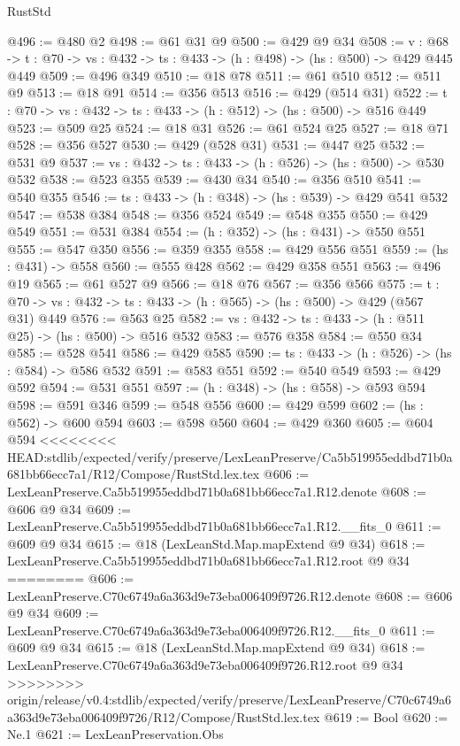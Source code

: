 \begin{lexlean}{RustStd}
\begin{coremodule}
{\begin{coremodule}
@496 := @480 @2
@498 := @61 @31 @9
@500 := @429 @9 @34
@508 := {v : @68} ->
  {t : @70} -> {vs : @432} -> {ts : @433} -> (h : @498) -> (hs : @500) -> @429 @445 @449
@509 := @496 @349
@510 := @18 @78
@511 := @61 @510
@512 := @511 @9
@513 := @18 @91
@514 := @356 @513
@516 := @429 (@514 @31)
@522 := {t : @70} -> {vs : @432} -> {ts : @433} -> (h : @512) -> (hs : @500) -> @516 @449
@523 := @509 @25
@524 := @18 @31
@526 := @61 @524 @25
@527 := @18 @71
@528 := @356 @527
@530 := @429 (@528 @31)
@531 := @447 @25
@532 := @531 @9
@537 := {vs : @432} -> {ts : @433} -> (h : @526) -> (hs : @500) -> @530 @532
@538 := @523 @355
@539 := @430 @34
@540 := @356 @510
@541 := @540 @355
@546 := {ts : @433} -> (h : @348) -> (hs : @539) -> @429 @541 @532
@547 := @538 @384
@548 := @356 @524
@549 := @548 @355
@550 := @429 @549
@551 := @531 @384
@554 := (h : @352) -> (hs : @431) -> @550 @551
@555 := @547 @350
@556 := @359 @355
@558 := @429 @556 @551
@559 := (hs : @431) -> @558
@560 := @555 @428
@562 := @429 @358 @551
@563 := @496 @19
@565 := @61 @527 @9
@566 := @18 @76
@567 := @356 @566
@575 := {t : @70} -> {vs : @432} -> {ts : @433} -> (h : @565) -> (hs : @500) -> @429 (@567 @31) @449
@576 := @563 @25
@582 := {vs : @432} -> {ts : @433} -> (h : @511 @25) -> (hs : @500) -> @516 @532
@583 := @576 @358
@584 := @550 @34
@585 := @528 @541
@586 := @429 @585
@590 := {ts : @433} -> (h : @526) -> (hs : @584) -> @586 @532
@591 := @583 @551
@592 := @540 @549
@593 := @429 @592
@594 := @531 @551
@597 := (h : @348) -> (hs : @558) -> @593 @594
@598 := @591 @346
@599 := @548 @556
@600 := @429 @599
@602 := (hs : @562) -> @600 @594
@603 := @598 @560
@604 := @429 @360
@605 := @604 @594
<<<<<<<< HEAD:stdlib/expected/verify/preserve/LexLeanPreserve/Ca5b519955eddbd71b0a681bb66ecc7a1/R12/Compose/RustStd.lex.tex
@606 := LexLeanPreserve.Ca5b519955eddbd71b0a681bb66ecc7a1.R12.denote
@608 := @606 @9 @34
@609 := LexLeanPreserve.Ca5b519955eddbd71b0a681bb66ecc7a1.R12.__fits_0
@611 := @609 @9 @34
@615 := @18 (LexLeanStd.Map.mapExtend @9 @34)
@618 := LexLeanPreserve.Ca5b519955eddbd71b0a681bb66ecc7a1.R12.root @9 @34
========
@606 := LexLeanPreserve.C70c6749a6a363d9e73eba006409f9726.R12.denote
@608 := @606 @9 @34
@609 := LexLeanPreserve.C70c6749a6a363d9e73eba006409f9726.R12.__fits_0
@611 := @609 @9 @34
@615 := @18 (LexLeanStd.Map.mapExtend @9 @34)
@618 := LexLeanPreserve.C70c6749a6a363d9e73eba006409f9726.R12.root @9 @34
>>>>>>>> origin/release/v0.4:stdlib/expected/verify/preserve/LexLeanPreserve/C70c6749a6a363d9e73eba006409f9726/R12/Compose/RustStd.lex.tex
@619 := Bool
@620 := Ne.{1}
@621 := LexLeanPreservation.Obs

\end{coremodule}}
\end{coremodule}
\end{lexlean}
